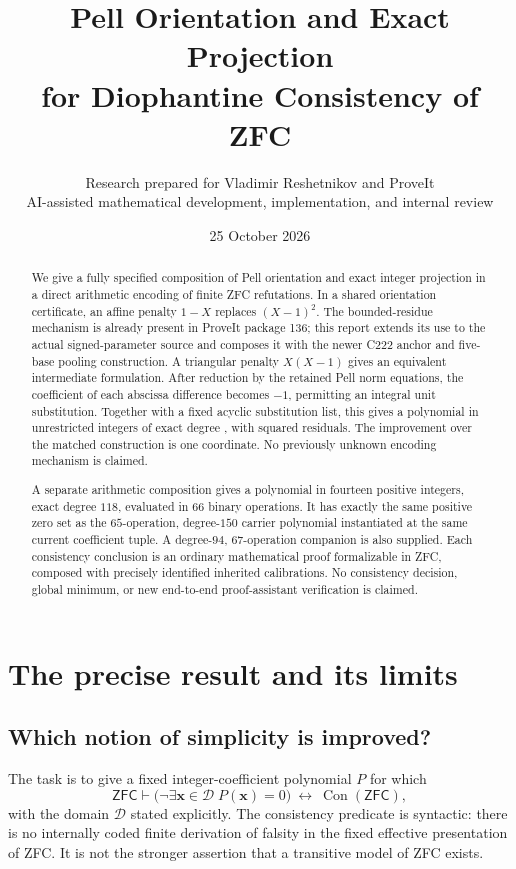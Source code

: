 \documentclass[11pt,letterpaper]{article}
\title{Pell Orientation and Exact Projection\\for Diophantine Consistency of ZFC}
\author{Research prepared for Vladimir Reshetnikov and ProveIt\\\small AI-assisted mathematical development, implementation, and internal review}
\date{25 October 2026}
\theoremstyle{definition}\newtheorem{definition}[theorem]{Definition}
\theoremstyle{remark}\newtheorem{remark}[theorem]{Remark}
\newcommand{\Con}{\operatorname{Con}}\newcommand{\ZFC}{\mathsf{ZFC}}
\begin{document}
\maketitle
\begin{abstract}
We give a fully specified composition of Pell orientation and exact integer projection in a direct arithmetic encoding of finite ZFC refutations. In a shared orientation certificate, an affine penalty $1-X$ replaces $(X-1)^2$. The bounded-residue mechanism is already present in ProveIt package 136; this report extends its use to the actual signed-parameter source and composes it with the newer C222 anchor and five-base pooling construction. A triangular penalty $X(X-1)$ gives an equivalent intermediate formulation. After reduction by the retained Pell norm equations, the coefficient of each abscissa difference becomes $-1$, permitting an integral unit substitution. Together with a fixed acyclic substitution list, this gives a polynomial in \DirectVars{} unrestricted integers of exact degree \DirectDegree{}, with \DirectRows{} squared residuals. The improvement over the matched construction is one coordinate. No previously unknown encoding mechanism is claimed.

A separate arithmetic composition gives a polynomial in fourteen positive integers, exact degree $118$, evaluated in $66$ binary operations. It has exactly the same positive zero set as the $65$-operation, degree-$150$ carrier polynomial instantiated at the same current coefficient tuple. A degree-$94$, $67$-operation companion is also supplied. Each consistency conclusion is an ordinary mathematical proof formalizable in ZFC, composed with precisely identified inherited calibrations. No consistency decision, global minimum, or new end-to-end proof-assistant verification is claimed.
\end{abstract}
\tableofcontents
\newpage

\section{The precise result and its limits}
\subsection{Which notion of simplicity is improved?}
The task is to give a fixed integer-coefficient polynomial $P$ for which
\begin{equation}\label{eq:target}
\ZFC\vdash\bigl(\neg\exists\boldsymbol x\in\mathcal D\;P(\boldsymbol x)=0\bigr)
\ \longleftrightarrow\ \Con(\ZFC),
\end{equation}
with the domain $\mathcal D$ stated explicitly. The consistency predicate is syntactic: there is no internally coded finite derivation of falsity in the fixed effective presentation of ZFC. It is not the stronger assertion that a transitive model of ZFC exists.
\end{document}
